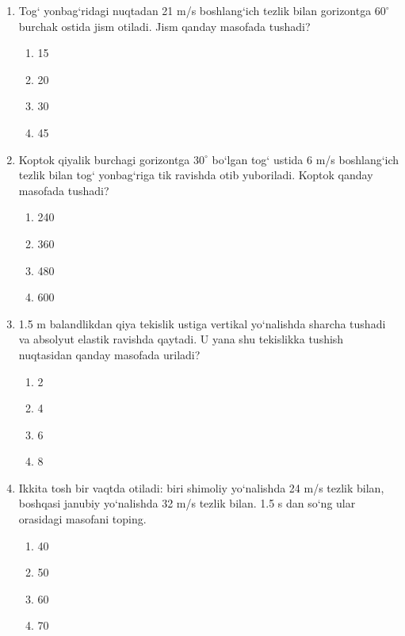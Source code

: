 \begin{enumerate}
\begin{enumerate}[label=\Alph*)]
\item 5
\item 10
\item 15
\item 20
\end{enumerate}

\item Tog‘ yonbag‘ridagi nuqtadan 21 m/s boshlang‘ich tezlik bilan gorizontga $60^\circ$ burchak ostida jism otiladi. Jism qanday masofada tushadi?

\begin{enumerate}[label=\Alph*)]
\item 15
\item 20
\item 30
\item 45
\end{enumerate}

\item Koptok qiyalik burchagi gorizontga $30^\circ$ bo‘lgan tog‘ ustida 6 m/s boshlang‘ich tezlik bilan tog‘ yonbag‘riga tik ravishda otib yuboriladi. Koptok qanday masofada tushadi?

\begin{enumerate}[label=\Alph*)]
\item 240
\item 360
\item 480
\item 600
\end{enumerate}

\item 1.5 m balandlikdan qiya tekislik ustiga vertikal yo‘nalishda sharcha tushadi va absolyut elastik ravishda qaytadi. U yana shu tekislikka tushish nuqtasidan qanday masofada uriladi?

\begin{enumerate}[label=\Alph*)]
\item 2
\item 4
\item 6
\item 8
\end{enumerate}

\item Ikkita tosh bir vaqtda otiladi: biri shimoliy yo‘nalishda 24 m/s tezlik bilan, boshqasi janubiy yo‘nalishda 32 m/s tezlik bilan. 1.5 s dan so‘ng ular orasidagi masofani toping.

\begin{enumerate}[label=\Alph*)]
\item 40
\item 50
\item 60
\item 70
\end{enumerate}


\end{enumerate}
